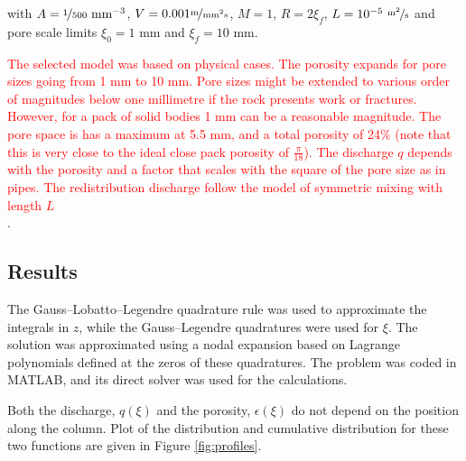 \documentclass{CFD2011}
\newcommand{\TODO}[1]{\textcolor{blue}{TODO: #1} \\}
\newcommand{\rev}[1]{\textcolor{red}{#1} \\}
\newcommand{\newf}[1]{#1}
\begin{document}
\noindent \newf{with $A=\nicefrac{1}{500}~\text{mm}^{-3}$, $V=0.001 \nicefrac{\text{m}}{\text{mm}^2 \text{s}}$, $M=1$, $R=2\xi_f$, $L=10^{-5}~\nicefrac{\text{m}^2}{\text{s}}$ and pore scale limits $\xi_0=1$ mm and $\xi_f=10$ mm.}

\rev{The selected model was based on physical cases. The porosity expands for pore sizes going from 1 mm to 10 mm. Pore sizes might be extended to various order of magnitudes below one millimetre if the rock presents work or fractures. However, for a pack of solid bodies 1 mm can be a reasonable magnitude. The pore space is has a maximum at 5.5 mm, and a total porosity of 24\% (note that this is very close to the ideal close pack porosity of $\tfrac{\pi}{18}$). The discharge $q$ depends with the porosity and a factor that scales with the square of the pore size as in pipes. The redistribution discharge follow the model of symmetric mixing with length $L$}.

\subsection{Results}
The Gauss--Lobatto--Legendre quadrature rule was used to approximate the integrals in $z$, while the Gauss--Legendre quadratures were used for $\xi$. The solution was approximated using a nodal expansion based on Lagrange polynomials defined at the zeros of these quadratures. The problem was coded in {MATLAB}, and its direct solver was used for the calculations.


Both the discharge, $q({\xi})$ and the porosity, $\epsilon({\xi})$ do not depend on the position along the column. Plot of the distribution and cumulative distribution for these two functions are given in Figure \ref{fig:profiles}.


\end{document}
